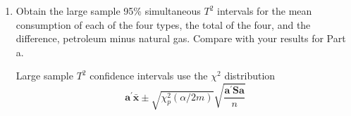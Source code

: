 \begin{enumerate}[label= (\alph*)]
    Large sample Bonferroni confidence intervals use the standard normal distribution
    \[
        \textbf{a}^{\prime} \bar{\textbf{x}}
        \pm
        z(\alpha/2m)
        \sqrt{\frac{\textbf{a}^{\prime} \textbf{S} \textbf{a}}{n}}
    \]

    \[
        \begin{NiceArray}{rrrr}
            0.77 \pm 2.64 \frac{\sqrt{0.86}}{\sqrt{50}} & \text{contains } \mu_{1} & \text{ or } & 0.42 \leq \mu_{1} \leq 1.11 \\
            0.51 \pm 2.64 \frac{\sqrt{0.57}}{\sqrt{50}} & \text{contains } \mu_{2} & \text{ or } & 0.23 \leq \mu_{2} \leq 0.79 \\
            0.44 \pm 2.64 \frac{\sqrt{0.17}}{\sqrt{50}} & \text{contains } \mu_{3} & \text{ or } & 0.28 \leq \mu_{3} \leq 0.59 \\
            0.16 \pm 2.64 \frac{\sqrt{0.04}}{\sqrt{50}} & \text{contains } \mu_{4} & \text{ or } & 0.08 \leq \mu_{4} \leq 0.24 \\
            1.87 \pm 2.64 \frac{\sqrt{3.91}}{\sqrt{50}} & \text{contains } \sum_{i=1}^{4}{\mu_{i}} & \text{ or } & 1.13 \leq \sum_{i=1}^{4}{\mu_{i}} \leq 2.61 \\
            0.26 \pm 2.64 \frac{\sqrt{0.15}}{\sqrt{50}} & \text{contains } \mu_{1} - \mu_{2} & \text{ or } & 0.11 \leq \mu_{1} - \mu_{2} \leq 0.40
        \end{NiceArray}
    \]

    \item Obtain the large sample 95\% simultaneous $T^{2}$ intervals for the mean consumption
    of each of the four types, the total of the four, and the difference, petroleum minus
    natural gas. Compare with your results for Part a.
    \par
    Large sample $T^{2}$ confidence intervals use the $\chi^{2}$ distribution
    \[
        \textbf{a}^{\prime} \bar{\textbf{x}}
        \pm
        \sqrt{\chi_{p}^{2}(\alpha/2m)}
        \sqrt{\frac{\textbf{a}^{\prime} \textbf{S} \textbf{a}}{n}}
    \]


\end{enumerate}
